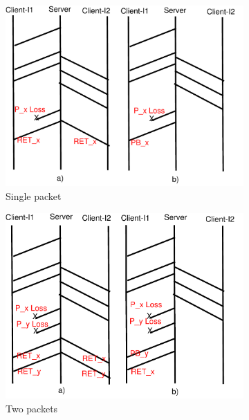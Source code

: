 \documentclass[10pt,conference,compsoc]{IEEEtran}
\begin{document}
\begin{figure}[!tbp]
 \begin{subfigure}[b]{0.32\textwidth}
	\includegraphics[angle=0, width=\textwidth, natwidth=610, natheight=400]{images/timing1P.pdf}
	\caption{Single packet}\label{timing1P}
 \end{subfigure}
 \hfill
 \begin{subfigure}[b]{0.32\textwidth} 
	\includegraphics[angle=0, width=\textwidth, natwidth=610, natheight=400]{images/timing2P.pdf}
	\caption{Two packets }\label{timing2P}
 \end{subfigure} 
 \hfill
 \begin{subfigure}[b]{0.32\textwidth}

\end{subfigure}
\end{figure}
\end{document}
